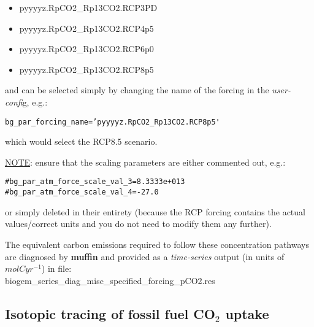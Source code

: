 \vspace{1mm}
\begin{itemize}[noitemsep]
\setlength{\itemindent}{.2in}
\item \textsf{\footnotesize pyyyyz.RpCO2\_Rp13CO2.RCP3PD}
\item \textsf{\footnotesize pyyyyz.RpCO2\_Rp13CO2.RCP4p5}
\item \textsf{\footnotesize pyyyyz.RpCO2\_Rp13CO2.RCP6p0}
\item \textsf{\footnotesize pyyyyz.RpCO2\_Rp13CO2.RCP8p5}
\end{itemize}
\vspace{2mm}
and can be selected simply by changing the name of the forcing in the \textit{user-confi}g, e.g.:
\vspace{-2pt}\small\begin{verbatim}
bg_par_forcing_name=’pyyyyz.RpCO2_Rp13CO2.RCP8p5'
\end{verbatim}\normalsize\vspace{-2pt}
\noindent which would select the RCP8.5 scenario.

\vspace{1mm}

\noindent \uline{NOTE}: ensure that
the scaling parameters are either commented out, e.g.:
\vspace{-2pt}\small\begin{verbatim}
#bg_par_atm_force_scale_val_3=8.3333e+013
#bg_par_atm_force_scale_val_4=-27.0
\end{verbatim}\normalsize\vspace{-2pt}
\noindent or simply deleted in their entirety (because the RCP forcing contains the actual values/correct units and you do not need to modify them any further).

\vspace{1mm}

The equivalent carbon emissions required to follow these concentration pathways are diagnosed by \textbf{muffin} and provided as a \textit{time-series} output (in units of \(mol C yr^{-1}\)) in file: 
\vspace{1mm}
\\\textsf{\footnotesize biogem\_series\_diag\_misc\_specified\_forcing\_pCO2.res}

\newpage

\subsection{Isotopic tracing of fossil fuel CO$_{2}$ uptake}

